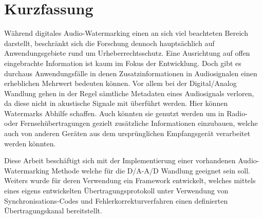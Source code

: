 \chapter*{Kurzfassung}

Während digitales Audio-Watermarking einen an sich viel beachteten Bereich darstellt, beschränkt sich die Forschung dennoch hauptsächlich auf Anwendungsgebiete rund um Urheberrechtsschutz. Eine Ausrichtung auf offen eingebrachte Information ist kaum im Fokus der Entwicklung. Doch gibt es durchaus Anwendungsfälle in denen Zusatzinformationen in Audiosignalen einen erheblichen Mehrwert bedeuten können. Vor allem bei der Digital/Analog Wandlung gehen in der Regel sämtliche Metadaten eines Audiosignals verloren, da diese nicht in akustische Signale mit überführt werden.
Hier können Watermarks Abhilfe schaffen. Auch könnten sie genutzt werden um in Radio- oder Fernsehübertragungen gezielt zusätzliche Informationen einzubauen, welche auch von anderen Geräten aus dem ursprünglichen Empfangsgerät verarbeitet werden könnten.

Diese Arbeit beschäftigt sich mit der Implementierung einer vorhandenen Audio-Watermarking Methode welche für die D/A-A/D Wandlung geeignet sein soll. Weiters wurde für deren Verwendung ein Framework entwickelt, welches mittels eines eigens entwickelten Übertragungsprotokoll unter Verwendung von Synchronisations-Codes und Fehlerkorrekturverfahren einen definierten Übertragungskanal bereitstellt. 